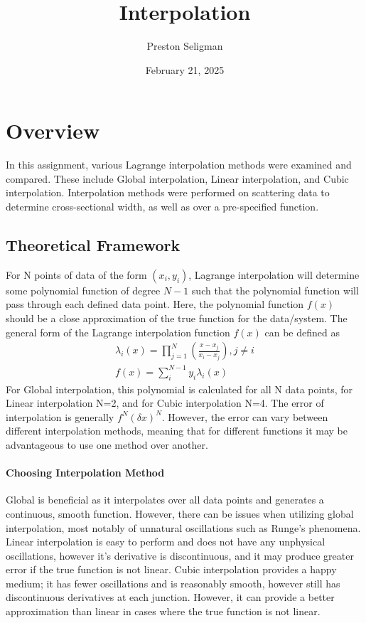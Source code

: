 \documentclass[aps,prb,groupedaddress,nofootinbib,floatfix]{revtex4}
\begin{document}
\author{Preston Seligman}
\title{Interpolation}
\date{February 21, 2025}
\maketitle
\section*{Overview} 
In this assignment, various Lagrange interpolation methods were examined and compared. These include Global interpolation, Linear interpolation, and Cubic interpolation. Interpolation methods were performed on scattering data to determine cross-sectional width, as well as over a pre-specified function.
\subsection*{Theoretical Framework} 
For N points of data of the form $(x_{i},y_{i})$, Lagrange interpolation will determine some polynomial function of degree $N-1$ such that the polynomial function will pass through each defined data point. Here, the polynomial function $f(x)$ should be a close approximation of the true function for the data/system. 
The general form of the Lagrange interpolation function $f(x)$ can be defined as
\begin{gather*}
\lambda_{i}(x)=\prod_{j=1}^{N} \left( \frac{x-x_{j}}{x_{i}-x_{j}} \right) , j \neq i\\
f(x)=\sum_{i}^{N-1} y_{i} \lambda_{i}(x)
\end{gather*}
For Global interpolation, this polynomial is calculated for all N data points, for Linear interpolation N=2, and for Cubic interpolation N=4. The error of interpolation is generally $f^{N}(\delta x)^{N}$. However, the error can vary between different interpolation methods, meaning that for different functions it may be advantageous to use one method over another.
\paragraph{Choosing Interpolation Method}
Global is beneficial as it interpolates over all data points and generates a continuous, smooth function. However, there can be issues when utilizing global interpolation, most notably of unnatural oscillations such as Runge's phenomena. Linear interpolation is easy to perform and does not have any unphysical oscillations, however it's derivative is discontinuous, and it may produce greater error if the true function is not linear. Cubic interpolation provides a happy medium; it has fewer oscillations and is reasonably smooth, however still has discontinuous derivatives at each junction. However, it can provide a better approximation than linear in cases where the true function is not linear.  
\end{document}
